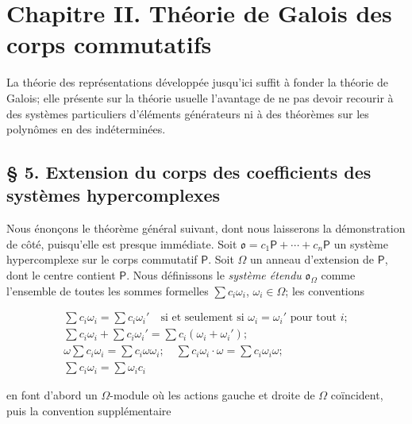 
\section*{Chapitre II. Théorie de Galois des corps commutatifs}\label{kapitel-ii.-galoissche-theorie-kommutativer-koerper}

La théorie des représentations développée jusqu'ici suffit à fonder la théorie de Galois; elle présente sur la théorie usuelle l'avantage de ne pas devoir recourir à des systèmes particuliers d'éléments générateurs ni à des théorèmes sur les polynômes en des indéterminées.

\subsection*{\S{} 5. Extension du corps des coefficients des systèmes hypercomplexes}\label{koeffizientenerweiterung-hyperkomplexer-systeme}

Nous énonçons le théorème général suivant, dont nous laisserons la démonstration de côté, puisqu'elle est presque immédiate. Soit \(\mathfrak{o}=c_1\mathsf P+\cdots+c_n\mathsf P\) un système hypercomplexe sur le corps commutatif \(\mathsf P\). Soit \(\Omega\) un anneau d'extension de \(\mathsf P\), dont le centre contient \(\mathsf P\). Nous définissons le \emph{système étendu} \(\mathfrak{o}_{\Omega}\) comme l'ensemble de toutes les sommes formelles \(\sum c_i\omega_i\), \(\omega_i\in\Omega\); les conventions

\[
\begin{array}{l}
\sum c_i\omega_i=\sum c_i\omega_i' \quad\text{si et seulement si } \omega_i=\omega_i' \text{ pour tout } i;\\
\sum c_i\omega_i+\sum c_i\omega_i'=\sum c_i(\omega_i+\omega_i');\\
\omega\sum c_i\omega_i=\sum c_i\omega\omega_i;\quad
\sum c_i\omega_i\cdot\omega=\sum c_i\omega_i\omega;\\
\sum c_i\omega_i=\sum \omega_i c_i
\end{array}
\]

en font d'abord un \(\Omega\)-module où les actions gauche et droite de \(\Omega\) coïncident, puis la convention supplémentaire

